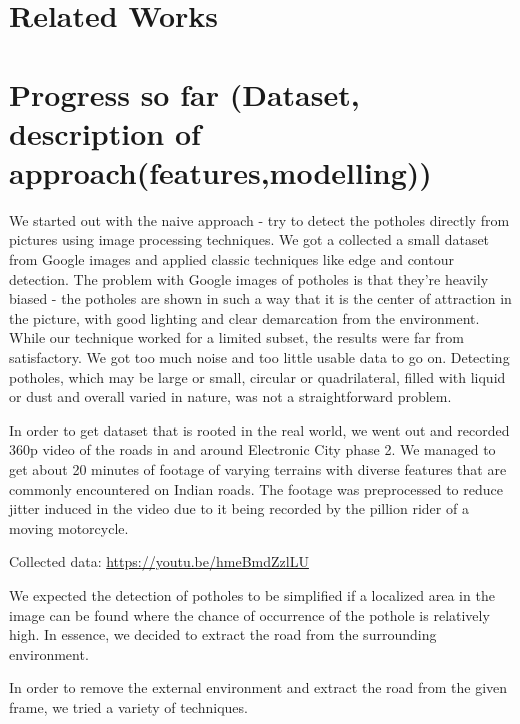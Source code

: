 \documentclass[12pt,a4paper]{article}
\begin{document}
\section{Related Works}


\section{Progress so far (Dataset, description of approach(features,modelling))}
We started out with the naive approach - try to detect the potholes directly from pictures using image processing techniques. We got a collected a small dataset from Google images and applied classic techniques like edge and contour detection. The problem with Google images of potholes is that they're heavily biased - the potholes are shown in such a way that it is the center of attraction in the picture, with good lighting and clear demarcation from the environment. While our technique worked for a limited subset, the results were far from satisfactory. We got too much noise and too little usable data to go on. Detecting potholes, which may be large or small, circular or quadrilateral, filled with liquid or dust and overall varied in nature, was not a straightforward problem.

In order to get dataset that is rooted in the real world, we went out and recorded 360p video of the roads in and around Electronic City phase 2. We managed to get about 20 minutes of footage of varying terrains with diverse features that are commonly encountered on Indian roads. The footage was preprocessed to reduce jitter induced in the video due to it being recorded by the pillion rider of a moving motorcycle. 

Collected data: \url{ https://youtu.be/hmeBmdZzlLU }

We expected the detection of potholes to be simplified if a localized area in the image can be found where the chance of occurrence of the pothole is relatively high. In essence, we decided to extract the road from the surrounding environment.

In order to remove the external environment and extract the road from the given frame, we tried a variety of techniques. 
\end{document}
